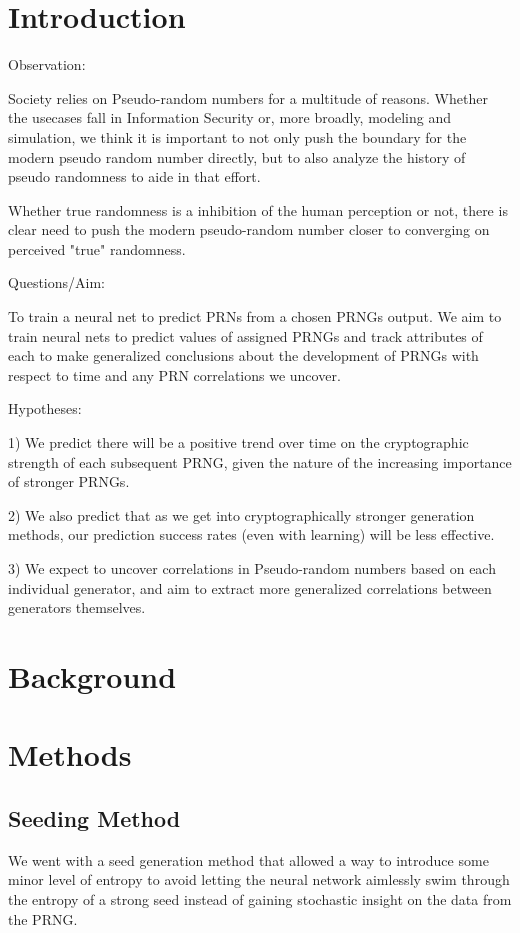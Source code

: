 \documentclass[conference]{IEEEtran}
\begin{document}
\section{Introduction}
Observation:

Society relies on Pseudo-random numbers for a multitude of reasons. Whether the usecases fall in Information Security or, more broadly, modeling and simulation, we think it is important to not only push the boundary for the modern pseudo random number directly, but to also analyze the history of pseudo randomness to aide in that effort.

Whether true randomness is a inhibition of the human perception or not, there is clear need to push the modern pseudo-random number closer to converging on perceived "true" randomness.

Questions/Aim:

To train a neural net to predict PRNs from a chosen PRNGs output. We aim to train neural nets to predict values of assigned PRNGs and track attributes of each to make generalized conclusions about the development of PRNGs with respect to time and any PRN correlations we uncover.

Hypotheses:

1) We predict there will be a positive trend over time on the cryptographic strength of each subsequent PRNG, given the nature of the increasing importance of stronger PRNGs.

2) We also predict that as we get into cryptographically stronger generation methods, our prediction success rates (even with learning) will be less effective.

3) We expect to uncover correlations in Pseudo-random numbers based on each individual generator, and aim to extract more generalized correlations between generators themselves.

\section{Background}


\section{Methods}
\subsection{Seeding Method}
We went with a seed generation method that allowed a way to introduce some minor level of entropy to avoid letting the neural network aimlessly swim through the entropy of a strong seed instead of gaining stochastic insight on the data from the PRNG.
\end{document}
